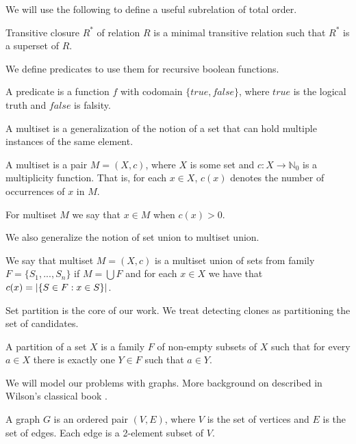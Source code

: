 We will use the following to define a useful subrelation of total order.

\begin{defn}
Transitive closure $R^*$ of relation $R$ is a minimal transitive relation 
such that $R^*$ is a superset of $R$.
\end{defn}

We define predicates to use them for recursive boolean functions.

\begin{defn}[predicate]
A predicate is a function $f$ with codomain $\{true, false\}$,
where $true$ is the logical truth and $false$ is falsity.
\end{defn}

A multiset is a generalization of the notion of a set that can hold multiple instances of the same element.

\begin{defn}[multiset]
A multiset is a pair $M = (X, c)$, where $X$ is some set and $c:X \rightarrow \mathbb{N}_0$
is a multiplicity function.
That is, for each $x \in X$, $c(x)$ denotes the number of occurrences of $x$ in $M$.
\end{defn}

For multiset $M$ we say that $x \in M$ when $c(x) > 0$.

We also generalize the notion of set union to multiset union.

\begin{defn}
We say that multiset $M = (X, c)$ is a multiset union of sets from family $F = \{S_1, ..., S_n\}$
if $M = \bigcup F$ and for each $x \in X$ we have that $c(x) = \left\vert \{S \in F : x \in S\} \right\vert$.
\end{defn}

Set partition is the core of our work.
We treat detecting clones as partitioning the set of candidates.

\begin{defn}
A partition of a set $X$ is a family $F$ of non-empty subsets of $X$
such that for every $a \in X$ there is exactly one $Y \in F$ such that $a \in Y$.
\end{defn}

We will model our problems with graphs.
More background on described in Wilson's classical book \cite{graphtheory}.

\begin{defn}[graph]
A graph $G$ is an ordered pair $(V,E)$, where $V$ is the set of vertices and $E$ is the set of edges.
Each edge is a 2-element subset of $V$.
\end{defn}

